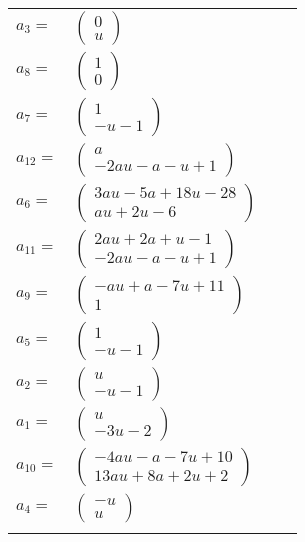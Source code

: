 \documentclass[1p]{elsarticle_modified}
\theoremstyle{definition}
\begin{document}
\begin{tabular}{m{7pt} m{180pt} m{7pt} m{180pt} }
\flushright $a_{3}=$&$\begin{pmatrix}0\\u\end{pmatrix}$ \\
\flushright $a_{8}=$&$\begin{pmatrix}1\\0\end{pmatrix}$ \\
\flushright $a_{7}=$&$\begin{pmatrix}1\\- u-1\end{pmatrix}$ \\
\flushright $a_{12}=$&$\begin{pmatrix}a\\-2 a u- a- u+1\end{pmatrix}$ \\
\flushright $a_{6}=$&$\begin{pmatrix}3 a u-5 a+18 u-28\\a u+2 u-6\end{pmatrix}$ \\
\flushright $a_{11}=$&$\begin{pmatrix}2 a u+2 a+u-1\\-2 a u- a- u+1\end{pmatrix}$ \\
\flushright $a_{9}=$&$\begin{pmatrix}- a u+a-7 u+11\\1\end{pmatrix}$ \\
\flushright $a_{5}=$&$\begin{pmatrix}1\\- u-1\end{pmatrix}$ \\
\flushright $a_{2}=$&$\begin{pmatrix}u\\- u-1\end{pmatrix}$ \\
\flushright $a_{1}=$&$\begin{pmatrix}u\\-3 u-2\end{pmatrix}$ \\
\flushright $a_{10}=$&$\begin{pmatrix}-4 a u- a-7 u+10\\13 a u+8 a+2 u+2\end{pmatrix}$ \\
\flushright $a_{4}=$&$\begin{pmatrix}- u\\u\end{pmatrix}$\\&\end{tabular}
\end{document}
